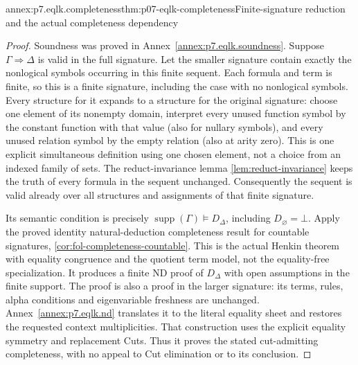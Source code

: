 \begin{annexitem}{annex:p7.eqlk.completeness}{thm:p07-eqlk-completeness}{Finite-signature reduction and the actual completeness dependency}
\begin{proof}
Soundness was proved in Annex~\ref{annex:p7.eqlk.soundness}.
Suppose \(\Gamma\Rightarrow\Delta\) is valid in the full signature.
Let the smaller signature contain exactly the nonlogical symbols occurring
in this finite sequent. Each formula and term is finite, so this is a
finite signature, including the case with no nonlogical symbols.
Every structure for it expands to a structure for the original signature:
choose one element of its nonempty domain, interpret every unused function
symbol by the constant function with that value (also for nullary symbols),
and every unused relation symbol by the empty relation (also at arity zero).
This is one explicit simultaneous definition using one chosen element,
not a choice from an indexed family of sets. The reduct-invariance lemma
\ref{lem:reduct-invariance} keeps the truth of every formula in the
sequent unchanged. Consequently the sequent is valid already over all
structures and assignments of that finite signature.

Its semantic condition is precisely
\(\operatorname{supp}(\Gamma)\models D_\Delta\), including
\(D_\varnothing=\bot\). Apply the proved identity natural-deduction
completeness result for countable signatures,
\cref{cor:fol-completeness-countable}. This is the actual Henkin theorem
with equality congruence and the quotient term model, not the equality-free
specialization. It produces a finite ND proof of \(D_\Delta\) with
open assumptions in the finite support. The proof is also a proof in
the larger signature: its terms, rules, alpha conditions and eigenvariable
freshness are unchanged. Annex~\ref{annex:p7.eqlk.nd} translates it
to the literal equality sheet and restores the requested context
multiplicities. That construction uses the explicit equality symmetry
and replacement Cuts. Thus it proves the stated cut-admitting
completeness, with no appeal to Cut elimination or to its conclusion.
\end{proof}
\end{annexitem}

